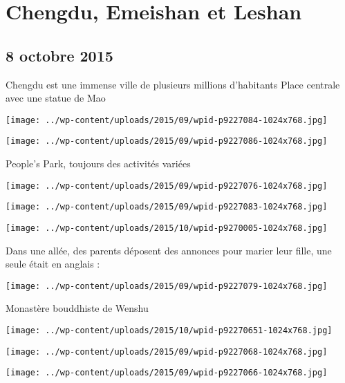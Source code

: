 \chapter{Chengdu, Emeishan et Leshan}
\section*{8 octobre 2015}
Chengdu est une immense ville de plusieurs millions d'habitants \newline
 Place centrale avec une statue de Mao \newline
 \newline
\centerline{\texttt{[image: ../wp-content/uploads/2015/09/wpid-p9227084-1024x768.jpg]} } 
 \newline
 \newline
\centerline{\texttt{[image: ../wp-content/uploads/2015/09/wpid-p9227086-1024x768.jpg]} } 
 \newline
 People's Park, toujours des activités variées \newline
 \newline
\centerline{\texttt{[image: ../wp-content/uploads/2015/09/wpid-p9227076-1024x768.jpg]} } 
 \newline
 \newline
\centerline{\texttt{[image: ../wp-content/uploads/2015/09/wpid-p9227083-1024x768.jpg]} } 
 \newline
 \newline
\centerline{\texttt{[image: ../wp-content/uploads/2015/10/wpid-p9270005-1024x768.jpg]} } 
 \newline
 Dans une allée, des parents déposent des annonces pour marier leur fille, une seule était en anglais : \newline
 \newline
\centerline{\texttt{[image: ../wp-content/uploads/2015/09/wpid-p9227079-1024x768.jpg]} } 
 \newline
 Monastère bouddhiste de Wenshu \newline
 \newline
\centerline{\texttt{[image: ../wp-content/uploads/2015/10/wpid-p92270651-1024x768.jpg]} } 
 \newline
 \newline
\centerline{\texttt{[image: ../wp-content/uploads/2015/09/wpid-p9227068-1024x768.jpg]} } 
 \newline
 \newline
\centerline{\texttt{[image: ../wp-content/uploads/2015/09/wpid-p9227066-1024x768.jpg]} } 
